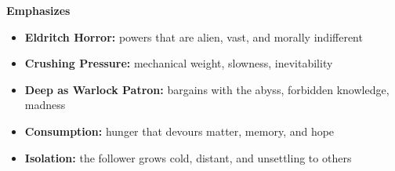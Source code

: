 \noindent\textbf{Emphasizes}
\begin{itemize}
  \item \textbf{Eldritch Horror:} powers that are alien, vast, and morally indifferent
  \item \textbf{Crushing Pressure:} mechanical weight, slowness, inevitability
  \item \textbf{Deep as Warlock Patron:} bargains with the abyss, forbidden knowledge, madness
  \item \textbf{Consumption:} hunger that devours matter, memory, and hope
  \item \textbf{Isolation:} the follower grows cold, distant, and unsettling to others
\end{itemize}